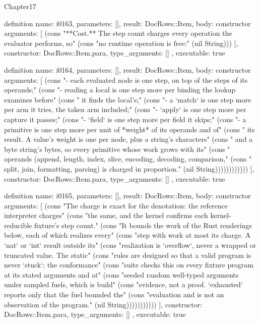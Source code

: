 \begin{lexlean}{Chapter17}
\begin{semanticmodule}
definition{
  name: i0163,
  parameters: [],
  result: DocRows::Item,
  body: constructor{
    arguments: [
      (cons "**Cost.** The step count charges every operation the evaluator performs, so" (cons "no runtime operation is free:" (nil String)))
    ],
    constructor: DocRows::Item.para,
    type_arguments: []
  },
  executable: true
}

definition{
  name: i0164,
  parameters: [],
  result: DocRows::Item,
  body: constructor{
    arguments: [
      (cons "- each evaluated node is one step, on top of the steps of its operands;" (cons "- reading a local is one step more per binding the lookup examines before" (cons "  it finds the local's;" (cons "- a `match` is one step more per arm it tries, the taken arm included;" (cons "- `apply` is one step more per capture it passes;" (cons "- `field` is one step more per field it skips;" (cons "- a primitive is one step more per unit of *weight* of its operands and of" (cons "  its result. A value's weight is one per node, plus a string's characters" (cons "  and a byte string's bytes, so every primitive whose work grows with its" (cons "  operands (append, length, index, slice, encoding, decoding, comparison," (cons "  split, join, formatting, parsing) is charged in proportion." (nil String))))))))))))
    ],
    constructor: DocRows::Item.para,
    type_arguments: []
  },
  executable: true
}

definition{
  name: i0165,
  parameters: [],
  result: DocRows::Item,
  body: constructor{
    arguments: [
      (cons "The charge is exact for the denotation: the reference interpreter charges" (cons "the same, and the kernel confirms each kernel-reducible fixture's step count." (cons "It bounds the work of the Rust renderings below, each of which realizes every" (cons "step with work at most its charge. A `nat` or `int` result outside its" (cons "realization is `overflow`, never a wrapped or truncated value. The static" (cons "rules are designed so that a valid program is never `stuck`; the conformance" (cons "suite checks this on every fixture program at its stated arguments and at" (cons "seeded random well-typed arguments under sampled fuels, which is build" (cons "evidence, not a proof. `exhausted` reports only that the fuel bounded the" (cons "evaluation and is not an observation of the program." (nil String)))))))))))
    ],
    constructor: DocRows::Item.para,
    type_arguments: []
  },
  executable: true
}


\end{semanticmodule}
\end{lexlean}
